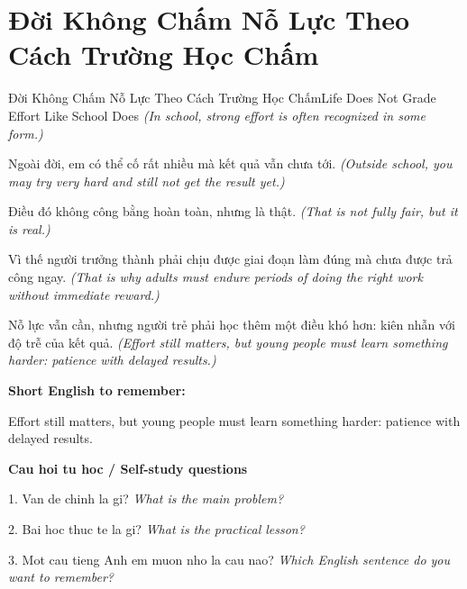 \section{Đời Không Chấm Nỗ Lực Theo Cách Trường Học Chấm}
\begin{truyen}{Đời Không Chấm Nỗ Lực Theo Cách Trường Học Chấm}{Life Does Not Grade Effort Like School Does}
\textit{(In school, strong effort is often recognized in some form.)}

Ngoài đời, em có thể cố rất nhiều mà kết quả vẫn chưa tới.
\textit{(Outside school, you may try very hard and still not get the result yet.)}

Điều đó không công bằng hoàn toàn, nhưng là thật.
\textit{(That is not fully fair, but it is real.)}

Vì thế người trưởng thành phải chịu được giai đoạn làm đúng mà chưa được trả công ngay.
\textit{(That is why adults must endure periods of doing the right work without immediate reward.)}

\end{truyen}

\begin{baihoc}
Nỗ lực vẫn cần, nhưng người trẻ phải học thêm một điều khó hơn: kiên nhẫn với độ trễ của kết quả.
\textit{(Effort still matters, but young people must learn something harder: patience with delayed results.)}
\end{baihoc}

\begin{ghinhoanh}
\textbf{Short English to remember:}

Effort still matters, but young people must learn something harder: patience with delayed results.

\end{ghinhoanh}

\begin{tuhocnhanh}
\textbf{Cau hoi tu hoc / Self-study questions}

1. Van de chinh la gi? \textit{What is the main problem?}

2. Bai hoc thuc te la gi? \textit{What is the practical lesson?}

3. Mot cau tieng Anh em muon nho la cau nao? \textit{Which English sentence do you want to remember?}
\end{tuhocnhanh}
\ngancach

